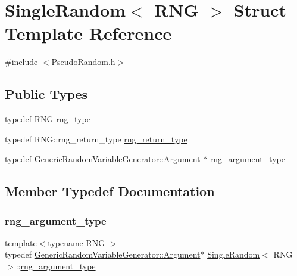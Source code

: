 \hypertarget{struct_single_random}{}\section{Single\+Random$<$ R\+NG $>$ Struct Template Reference}
\label{struct_single_random}


{\ttfamily \#include $<$Pseudo\+Random.\+h$>$}

\subsection*{Public Types}
\begin{DoxyCompactItemize}
\item 
typedef R\+NG \hyperlink{struct_single_random_a779e253bef5bae088b1a5eeae8d97c52}{rng\+\_\+type}
\item 
typedef R\+N\+G\+::rng\+\_\+return\+\_\+type \hyperlink{struct_single_random_a34726d0dbd0e41d5efca1c5890400675}{rng\+\_\+return\+\_\+type}
\item 
typedef \hyperlink{class_generic_random_variable_generator_1_1_argument}{Generic\+Random\+Variable\+Generator\+::\+Argument} $\ast$ \hyperlink{struct_single_random_a8c75a60ee8fcac9a243bff8df4f19100}{rng\+\_\+argument\+\_\+type}
\end{DoxyCompactItemize}


\subsection{Member Typedef Documentation}
\hypertarget{struct_single_random_a8c75a60ee8fcac9a243bff8df4f19100}{}\label{struct_single_random_a8c75a60ee8fcac9a243bff8df4f19100} 
\subsubsection{\texorpdfstring{rng\+\_\+argument\+\_\+type}{rng\_argument\_type}}
{\footnotesize\ttfamily template$<$typename R\+NG $>$ \\
typedef \hyperlink{class_generic_random_variable_generator_1_1_argument}{Generic\+Random\+Variable\+Generator\+::\+Argument}$\ast$ \hyperlink{struct_single_random}{Single\+Random}$<$ R\+NG $>$\+::\hyperlink{struct_single_random_a8c75a60ee8fcac9a243bff8df4f19100}{rng\+\_\+argument\+\_\+type}}

